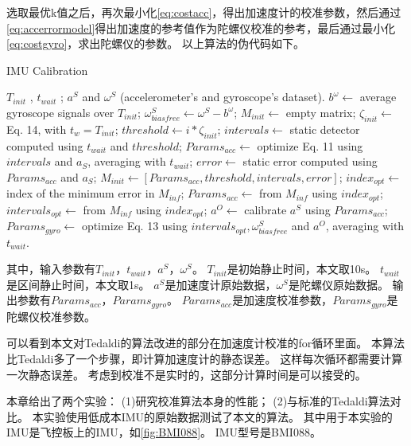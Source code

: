 \documentclass[
  type=master
]{gdutthesis}
\begin{document}
选取最优k值之后，再次最小化\autoref{eq:costacc}，得出加速度计的校准参数，然后通过\autoref{eq:accerrormodel}得出加速度的参考值作为陀螺仪校准的参考，最后通过最小化\autoref{eq:costgyro}，求出陀螺仪的参数。
以上算法的伪代码如下。
\begin{algorithm}[H] 
	\caption{IMU Calibration} 
	\label{alg1} 
	\begin{algorithmic}
		\REQUIRE $T_{init}$ , $t_{wait}$ ; $a^S$ and $\omega^S$ (accelerometer's and
		gyroscope's dataset).
		\STATE $b^{\omega} \gets$ average gyroscope signals over $T_{init}$; 
		\STATE $\omega^S_{biasfree} \gets \omega^S - b^{\omega}$; 
		\STATE $M_{init} \gets$ empty matrix; 
		\STATE $\zeta_{init} \gets $ Eq. 14, with $t_w = T_{init}$;
		\STATE $threshold \gets i*\zeta_{init}$;
		\STATE $intervals \gets$ static detector computed using $t_{wait}$ and $threshold$;
		\STATE $Params_{acc} \gets$ optimize Eq. 11 using
		$intervals$ and $a_S$, averaging with $t_{wait}$; 
		\STATE $error \gets $ static error computed using $Params_{acc}$ and $a_S$;
		\STATE $M_{init} \gets [Params_{acc},threshold,intervals,error]$;
		\ENDFOR
		\STATE $index_{opt} \gets $ index of the minimum error in $M_{inf}$; 
		\STATE $Params_{acc} \gets $ from $M_{inf}$ using $index_{opt}$; 
		\STATE $intervals_{opt} \gets $ from $M_{inf}$ using $index_{opt}$; 
		\STATE $a^O \gets$ calibrate $a^S$ using $Params_{acc}$;
		\STATE $Params_{gyro} \gets $ optimize Eq. 13 using $intervals_{opt},\omega^S_{biasfree}$ and $a^O$, averaging with $t_{wait}$. 
	\end{algorithmic} 
\end{algorithm}

其中，输入参数有$T_{init}$，$t_{wait}$，$a^S$，$\omega^S$。
$T_{init}$是初始静止时间，本文取10s。
$t_{wait}$是区间静止时间，本文取1s。
$a^S$是加速度计原始数据，$\omega^S$是陀螺仪原始数据。
输出参数有$Params_{acc}$，$Params_{gyro}$。
$Params_{acc}$是加速度校准参数，$Params_{gyro}$是陀螺仪校准参数。

可以看到本文对Tedaldi的算法改进的部分在加速度计校准的for循环里面。
本算法比Tedaldi多了一个步骤，即计算加速度计的静态误差。
这样每次循环都需要计算一次静态误差。
考虑到校准不是实时的，这部分计算时间是可以接受的。

本章给出了两个实验：
(1)研究校准算法本身的性能；
(2)与标准的Tedaldi算法对比。
本实验使用低成本IMU的原始数据测试了本文的算法。
其中用于本实验的IMU是飞控板上的IMU，如\autoref{fig:BMI088}。
IMU型号是BMI088。
\end{document}
